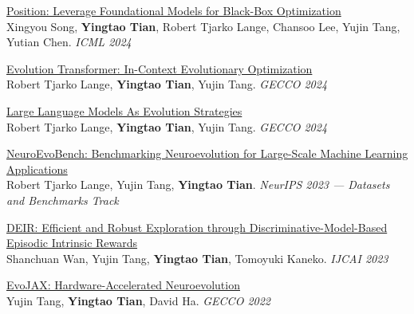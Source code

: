 \documentclass[line,margin]{cv}
\begin{document}
\begin{resume}
{  \begin{samepage}
  \href{https://proceedings.mlr.press/v235/song24h.html}{Position: Leverage Foundational Models for Black-Box Optimization}\\
  Xingyou Song, \textbf{Yingtao Tian}, Robert Tjarko Lange, Chansoo Lee, Yujin Tang, Yutian Chen. \emph{ICML 2024}
  \par\end{samepage}

  \begin{samepage}
  \href{https://arxiv.org/abs/2403.02985}{Evolution Transformer: In-Context Evolutionary Optimization}\\
  Robert Tjarko Lange, \textbf{Yingtao Tian}, Yujin Tang. \emph{GECCO 2024}
  \par\end{samepage}

  \begin{samepage}
  \href{https://arxiv.org/abs/2402.18381}{Large Language Models As Evolution Strategies}\\
  Robert Tjarko Lange, \textbf{Yingtao Tian}, Yujin Tang. \emph{GECCO 2024}
  \par\end{samepage}

  \begin{samepage}
  \href{https://openreview.net/forum?id=s6qtLyR6uJ}{NeuroEvoBench: Benchmarking Neuroevolution for Large-Scale Machine Learning Applications}\\
  Robert Tjarko Lange, Yujin Tang, \textbf{Yingtao Tian}. \emph{NeurIPS 2023 --- Datasets and Benchmarks Track}
  \par\end{samepage}

  \begin{samepage}
  \href{https://arxiv.org/abs/2304.10770}{DEIR: Efficient and Robust Exploration through Discriminative-Model-Based Episodic Intrinsic Rewards}\\
  Shanchuan Wan, Yujin Tang, \textbf{Yingtao Tian}, Tomoyuki Kaneko. \emph{IJCAI 2023}
  \par\end{samepage}

  \begin{samepage}
  \href{https://arxiv.org/abs/2202.05008}{EvoJAX: Hardware-Accelerated Neuroevolution}\\
  Yujin Tang, \textbf{Yingtao Tian}, David Ha. \emph{GECCO 2022}
  \par\end{samepage}

}
\end{resume}
\end{document}
